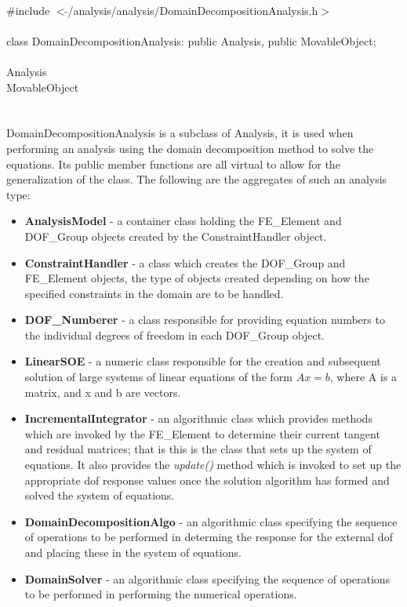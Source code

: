 

   \\
\indent \#include $<\tilde{
}$/analysis/analysis/DomainDecompositionAnalysis.h$>$  \\ 

  \\
\indent class DomainDecompositionAnalysis: public Analysis, public MovableObject;  \\

 \\
\indent Analysis \\
\indent MovableObject \\
\indent{} \\

 \\ 
\indent DomainDecompositionAnalysis is a subclass of Analysis, 
it is used when performing an analysis using the domain decomposition
method to solve the equations. Its public member functions are all
virtual to allow for the generalization of the 
class. The following are the aggregates of such an analysis type:
\begin{itemize}
\item {\bf AnalysisModel} - a container class holding the FE\_Element
and DOF\_Group objects created by the ConstraintHandler object. 
\item {\bf ConstraintHandler} - a class which creates the DOF\_Group
and FE\_Element objects, the type of objects created depending on how
the specified constraints in the domain are to be handled. 
\item {\bf DOF\_Numberer} - a class responsible for providing equation
numbers to the individual degrees of freedom in each DOF\_Group object.
\item {\bf LinearSOE} - a numeric class responsible for the creation
and subsequent solution of large systems of linear equations of the
form $Ax = b$, where A is a matrix, and x and b are vectors.
\item {\bf IncrementalIntegrator} - an algorithmic class which provides
methods which are invoked by the FE\_Element to determine their
current tangent and residual matrices; that is this is the class that
sets up the system of equations.  It also provides the {\em
update()} method which is invoked to set up the appropriate dof
response values once the solution algorithm has formed and solved the
system of equations.
\item {\bf DomainDecompositionAlgo} - an algorithmic class specifying the
sequence of operations to be performed in determing the response
for the external dof and placing these in the system of equations.
\item {\bf DomainSolver} - an algorithmic class specifying the
sequence of operations to be performed in performing the numerical 
operations.
\end{itemize}



